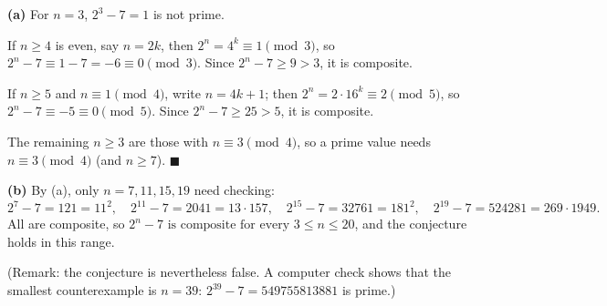 \textbf{(a)} For $n=3$, $2^3-7=1$ is not prime.

If $n\ge4$ is even, say $n=2k$, then $2^n=4^k\equiv1\pmod3$, so $2^n-7\equiv1-7=-6\equiv0\pmod3$. Since $2^n-7\ge9>3$, it is composite.

If $n\ge5$ and $n\equiv1\pmod4$, write $n=4k+1$; then $2^n=2\cdot16^k\equiv2\pmod5$, so $2^n-7\equiv-5\equiv0\pmod5$. Since $2^n-7\ge25>5$, it is composite.

The remaining $n\ge3$ are those with $n\equiv3\pmod4$, so a prime value needs $n\equiv3\pmod4$ (and $n\ge7$). $\blacksquare$

\textbf{(b)} By (a), only $n=7,11,15,19$ need checking:
\[2^7-7=121=11^2,\quad2^{11}-7=2041=13\cdot157,\quad2^{15}-7=32761=181^2,\quad2^{19}-7=524281=269\cdot1949.\]
All are composite, so $\boxed{2^n-7\text{ is composite for every }3\le n\le20}$, and the conjecture holds in this range.

(Remark: the conjecture is nevertheless false. A computer check shows that the smallest counterexample is $n=39$: $2^{39}-7=549755813881$ is prime.)
